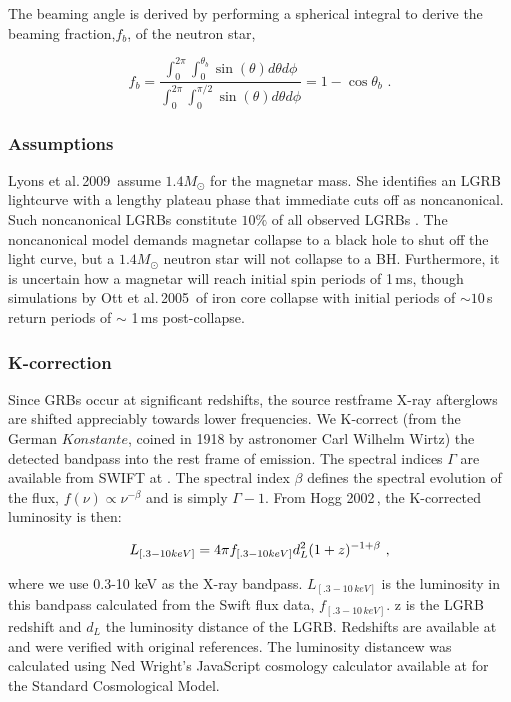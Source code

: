 \documentclass{article}
\begin{document}
The beaming angle is derived by performing a spherical integral to derive the beaming fraction,$f_b$, of the neutron star,

\begin{equation}
f_b=\frac{\int_0^{2\pi} \int_0^{\theta_b} \sin(\theta) d\theta d\phi}{\int_0^{2\pi} \int_0^{\pi/2} \sin(\theta) d\theta d\phi} = 1-\cos{\theta_b}\,\,.
\end{equation}

\subsubsection{Assumptions}

Lyons et al.\,2009\,\cite{Lyons:2009ka} assume $1.4 M_{\odot}$ for the magnetar mass. She identifies an LGRB lightcurve with a lengthy plateau phase that immediate cuts off as noncanonical. Such noncanonical LGRBs constitute $10\%$ of all observed LGRBs \cite{Lyons:2009ka}. The noncanonical model demands magnetar collapse to a black hole to shut off the light curve, but a $1.4 M_{\odot}$  neutron star will not collapse to a BH. Furthermore, it is uncertain how a magnetar will reach initial spin periods of 1\,ms, though simulations by Ott et al.\,2005\,\cite{Ott:2005wh} of iron core collapse with initial periods of $\sim 10$\,s return periods of $\sim$ 1\,ms post-collapse.

\subsubsection{K-correction}
Since GRBs occur at significant redshifts, the source restframe X-ray afterglows are shifted appreciably towards lower frequencies. We K-correct (from the German $Konstante$, coined in 1918 by astronomer Carl Wilhelm Wirtz) the detected bandpass into the rest frame of emission. The spectral indices $\Gamma$ are available from SWIFT at \cite{swift}. The spectral index $\beta$ defines the spectral evolution of the flux, $f(\nu) \propto \nu^{-\beta}$ and is simply $\Gamma -1$. From Hogg 2002\,\cite{Hogg:2002yh}, the K-corrected luminosity is then:

\begin{equation} L_{[.3-10 keV]} = 4\pi\* f_{[.3-10 keV]}d_{L}^2  (1+z)^{-1+\beta}\,\,,
\end{equation}

where we use 0.3-10 keV as the X-ray bandpass.  $L_{[.3-10\,keV]}$ is the luminosity in this bandpass calculated from the Swift flux data,  $f_{[.3-10\,keV]}$. z is the LGRB redshift and $d_L$ the luminosity distance of the LGRB. Redshifts are available at \cite{grbhosts} and were verified with original references. The luminosity distancew was calculated using Ned Wright's JavaScript cosmology calculator available at \cite{cosmoc} for the Standard Cosmological Model.
\end{document}
